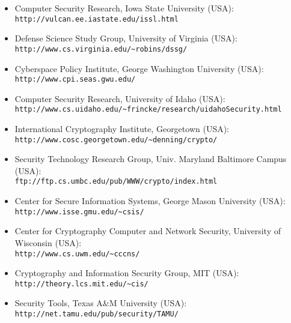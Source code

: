 \begin{itemize}
{\tt http://ece.wpi.edu/Research/crypt.html}
\item Computer Security Research, Iowa State University (USA):\\
{\tt http://vulcan.ee.iastate.edu/issl.html}
\item Defense Science Study Group, University of Virginia (USA):\\
{\tt http://www.cs.virginia.edu/\~{}robins/dssg/}
\item Cyberspace Policy Institute, George Washington University (USA):\\
{\tt http://www.cpi.seas.gwu.edu/}
\item Computer Security Research, University of Idaho (USA):\\
{\tt http://www.cs.uidaho.edu/\~{}frincke/research/uidahoSecurity.html}
\item International Cryptography Institute, Georgetown (USA):\\
{\tt http://www.cosc.georgetown.edu/\~{}denning/crypto/}
\item Security Technology Research Group, Univ. Maryland Baltimore Campus (USA):\\
{\tt ftp://ftp.cs.umbc.edu/pub/WWW/crypto/index.html}
\item Center for Secure Information Systems, George Mason University (USA):\\
{\tt http://www.isse.gmu.edu/\~{}csis/}
\item Center for Cryptography Computer and Network Security, University of Wisconsin (USA):\\
{\tt http://www.cs.uwm.edu/\~{}cccns/}
\item Cryptography and Information Security Group, MIT (USA):\\
{\tt http://theory.lcs.mit.edu/\~{}cis/}
\item Security Tools, Texas A\&M University (USA):\\
{\tt http://net.tamu.edu/pub/security/TAMU/}
\end{itemize}
